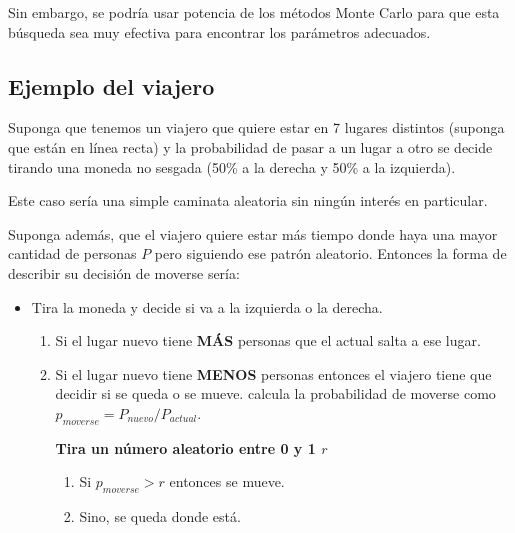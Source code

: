 \documentclass[
  12pt,
]{book}
\providecommand{\tightlist}{%
  \setlength{\itemsep}{0pt}\setlength{\parskip}{0pt}}
\theoremstyle{definition}
\theoremstyle{definition}
\theoremstyle{definition}
\theoremstyle{remark}
\begin{document}
Sin embargo, se podría usar potencia de los métodos Monte Carlo para que esta búsqueda sea muy efectiva para encontrar los parámetros adecuados.

\hypertarget{ejemplo-del-viajero}{%
\subsection{Ejemplo del viajero}\label{ejemplo-del-viajero}}

Suponga que tenemos un viajero que quiere estar en 7 lugares distintos (suponga que están en línea recta) y la probabilidad de pasar a un lugar a otro se decide tirando una moneda no sesgada (50\% a la derecha y 50\% a la izquierda).

Este caso sería una simple caminata aleatoria sin ningún interés en particular.

Suponga además, que el viajero quiere estar más tiempo donde haya una mayor cantidad de personas \(P\) pero siguiendo ese patrón aleatorio. Entonces la forma de describir su decisión de moverse sería:

\begin{itemize}
\tightlist
\item
  Tira la moneda y decide si va a la izquierda o la derecha.

  \begin{enumerate}
  \def\labelenumi{\arabic{enumi}.}
  \item
    Si el lugar nuevo tiene \textbf{MÁS} personas que el actual salta a ese lugar.
  \item
    Si el lugar nuevo tiene \textbf{MENOS} personas entonces el viajero tiene que decidir si se queda o se mueve. \textbar{} calcula la probabilidad de moverse como \(p_{moverse} = P_{nuevo}/P_{actual}\).

    \textbf{Tira un número aleatorio entre 0 y 1 \(r\)}

    \begin{enumerate}
    \def\labelenumii{\arabic{enumii}.}
    \tightlist
    \item
      Si \(p_{moverse}>r\) entonces se mueve.
    \item
      Sino, se queda donde está.
    \end{enumerate}
  \end{enumerate}
\end{itemize}
\end{document}
